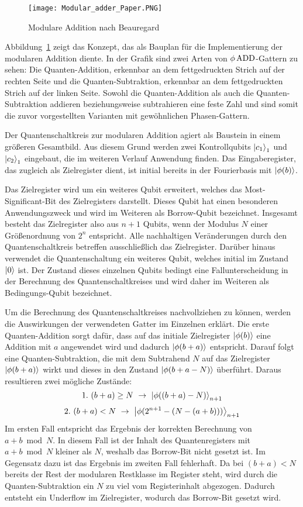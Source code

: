 \begin{figure}[H]
  \centering
  \texttt{[image: Modular\_adder\_Paper.PNG]}
  \caption{Modulare Addition nach Beauregard~\cite{beauregard2003circuit}}
  \label{fig:modulare_addition_paper}
\end{figure}
Abbildung~\ref{fig:modulare_addition_paper} zeigt das Konzept, 
das als Bauplan für die Implementierung der modularen Addition diente.
In der Grafik sind zwei Arten von \(\phi \operatorname{ADD}\)-Gattern zu sehen:
Die Quanten-Addition, erkennbar an dem fettgedruckten Strich auf der rechten Seite 
und die Quanten-Subtraktion, erkennbar an dem fettgedruckten Strich auf der linken Seite.
Sowohl die Quanten-Addition als auch die Quanten-Subtraktion addieren beziehungsweise subtrahieren eine feste Zahl und 
sind somit die zuvor vorgestellten Varianten mit gewöhnlichen Phasen-Gattern.

Der Quantenschaltkreis zur modularen Addition agiert als Baustein in einem größeren Gesamtbild. 
Aus diesem Grund werden zwei Kontrollqubits \(\ket{c_1}_1\) und \(\ket{c_2}_1\) eingebaut, 
die im weiteren Verlauf Anwendung finden.
Das Eingaberegister, das zugleich als Zielregister dient,  
ist initial bereits in der Fourierbasis mit \(\ket{\phi(b)}\).

Das Zielregister wird um ein weiteres Qubit erweitert, 
welches das Most-Significant-Bit des Zielregisters darstellt.
Dieses Qubit hat einen besonderen Anwendungszweck und wird im Weiteren als Borrow-Qubit bezeichnet.
Insgesamt besteht das Zielregister also aus \(n+1\) Qubits, 
wenn der Modulus \(N\) einer Größenordnung von \(2^n\) entspricht.
Alle nachhaltigen Veränderungen durch den Quantenschaltkreis betreffen ausschließlich das Zielregister.
Darüber hinaus verwendet die Quantenschaltung ein weiteres Qubit, 
welches initial im Zustand \(\ket{0}\) ist.
Der Zustand dieses einzelnen Qubits bedingt eine Fallunterscheidung in der Berechnung des Quantenschaltkreises und 
wird daher im Weiteren als Bedingungs-Qubit bezeichnet. 

Um die Berechnung des Quantenschaltkreises nachvollziehen zu können, 
werden die Auswirkungen der verwendeten Gatter im Einzelnen erklärt.
Die erste Quanten-Addition sorgt dafür, 
dass auf das initiale Zielregister \(\ket{\phi(b)}\) eine Addition mit \(a\) angewendet wird und 
dadurch \(\ket{\phi(b + a)}\) entspricht.
Darauf folgt eine Quanten-Subtraktion, 
die mit dem Subtrahend \(N\) auf das Zielregister \(\ket{\phi(b + a)}\) wirkt und 
dieses in den Zustand \(\ket{\phi(b + a - N)}\) überführt. 
Daraus resultieren zwei mögliche Zustände:
\[1.~(b+a) \geq N~\rightarrow~\ket{\phi((b+a) - N)}_{n+1}\]
\[2.~
(b+a) < N~\rightarrow~\ket{\phi(2^{n+1}-(N-(a+b)))}_{n+1}
  \]
Im ersten Fall entspricht das Ergebnis der korrekten Berechnung von \(a+b \bmod N\).
In diesem Fall ist der Inhalt des Quantenregisters mit \(a+b \bmod N\) kleiner als \(N\), 
weshalb das Borrow-Bit nicht gesetzt ist.
Im Gegensatz dazu ist das Ergebnis im zweiten Fall fehlerhaft.
Da bei \((b+a) < N\) bereits der Rest der modularen Restklasse im Register steht, 
wird durch die Quanten-Subtraktion ein \(N\) zu viel vom Registerinhalt abgezogen.
Dadurch entsteht ein Underflow im Zielregister, 
wodurch das Borrow-Bit gesetzt wird.

